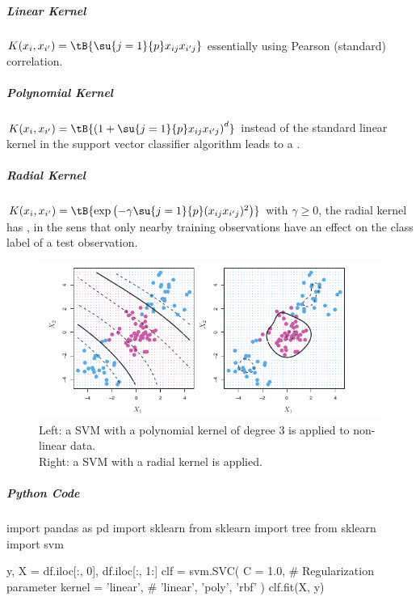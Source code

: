 \subparagraph{Linear Kernel}
$K(x_{i},x_{i'})=\tB{\su{{j=1}}{p}x_{ij}x_{i'j}}$ essentially  using Pearson (standard)
correlation.
\subparagraph{Polynomial Kernel}
$K(x_{i},x_{i'})=\tB{\left( 1 + \su{{j=1}}{p}x_{ij}x_{i'j} \right)^{d}}$
instead of the standard linear kernel in the support vector classifier
algorithm leads to a .
\subparagraph{Radial Kernel}
$K(x_{i},x_{i'})=\tB{\exp\left( -\gamma\su{{j=1}}{p}(x_{ij}x_{i'j})^{2} \right)}$
with $\gamma\geq 0$, the radial kernel has , in the
sens that only nearby training observations have an effect on the class
label of a test observation.
\begin{figure}[H]
	\begin{center}
		\includegraphics[width=\textwidth]{./chap/1chap/8sec/images/3polynomialRadialKernel.png}
	\end{center}
	\caption{Left: a SVM with a polynomial kernel of degree 3 is
	applied to non-linear data.\\
	Right: a SVM  with a radial kernel is applied.}
	\label{fig:8.3polynomialRadialKernel}
\end{figure}

\subparagraph{Python Code}
\begin{python}
import pandas as pd
import sklearn
from sklearn import tree
from sklearn import svm

y, X = df.iloc[:, 0], df.iloc[:, 1:]
clf = svm.SVC(
   C = 1.0, # Regularization parameter
   kernel = 'linear', # {'linear', 'poly', 'rbf'}
)
clf.fit(X, y)

\end{python}
